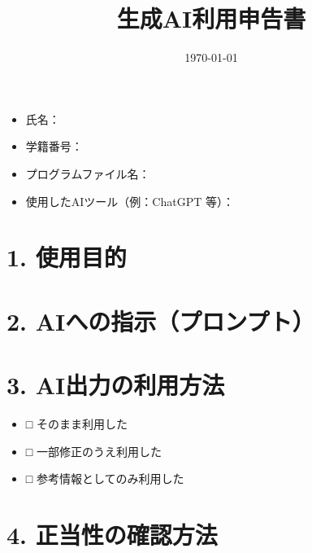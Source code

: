 \documentclass[a4paper,12pt]{article}
\title{生成AI利用申告書}
\date{\today}
\begin{document}
\maketitle

\vspace{1em}

\noindent
\begin{itemize}
  \item 氏名：
  \item 学籍番号：
  \item プログラムファイル名：
  \item 使用したAIツール（例：ChatGPT 等）：
\end{itemize}

\vspace{1em}

\section*{1. 使用目的}

\section*{2. AIへの指示（プロンプト）}

\section*{3. AI出力の利用方法}
\begin{itemize}
  \item □ そのまま利用した
  \item □ 一部修正のうえ利用した
  \item □ 参考情報としてのみ利用した
\end{itemize}

\section*{4. 正当性の確認方法}
\end{document}
